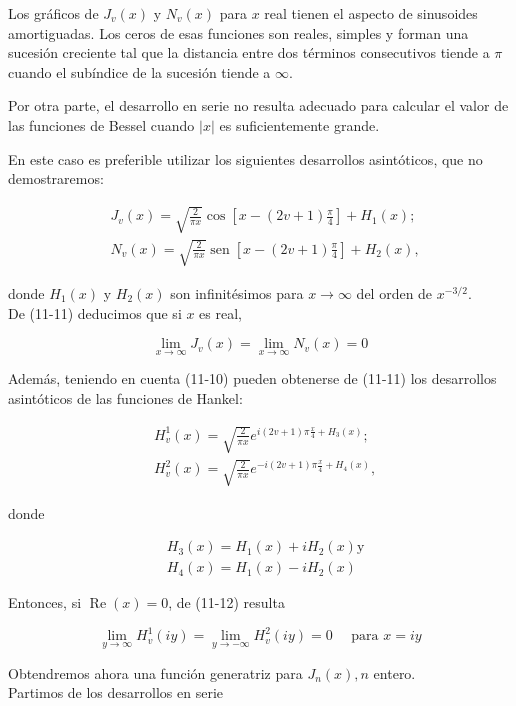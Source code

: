 \documentclass[10pt]{article}
\theoremstyle{plain}
\theoremstyle{definition}
\theoremstyle{remark}
\begin{document}
Los gráficos de $J_{v}(x)$ y $N_{v}(x)$ para $x$ real tienen el aspecto de sinusoides amortiguadas. Los ceros de esas funciones son reales, simples y forman una sucesión creciente tal que la distancia entre dos términos consecutivos tiende a $\pi$ cuando el subíndice de la sucesión tiende a $\infty$.

Por otra parte, el desarrollo en serie no resulta adecuado para calcular el valor de las funciones de Bessel cuando $|x|$ es suficientemente grande.

En este caso es preferible utilizar los siguientes desarrollos asintóticos, que no demostraremos:


\begin{align*}
& J_{v}(x)=\sqrt{\frac{2}{\pi x}} \cos \left[x-(2 v+1) \frac{\pi}{4}\right]+H_{1}(x) ;  \tag{11-11}\\
& N_{v}(x)=\sqrt{\frac{2}{\pi x}} \operatorname{sen}\left[x-(2 v+1) \frac{\pi}{4}\right]+H_{2}(x),
\end{align*}


donde $H_{1}(x)$ y $H_{2}(x)$ son infinitésimos para $x \rightarrow \infty$ del orden de $x^{-3 / 2}$.\\
De (11-11) deducimos que si $x$ es real,

$$
\lim _{x \rightarrow \infty} J_{v}(x)=\lim _{x \rightarrow \infty} N_{v}(x)=0
$$


Además, teniendo en cuenta (11-10) pueden obtenerse de (11-11) los desarrollos asintóticos de las funciones de Hankel:


\begin{align*}
& H_{v}^{1}(x)=\sqrt{\frac{2}{\pi x}} e^{i(2 v+1) \pi \frac{x}{4}+H_{3}(x)} ; \\
& H_{v}^{2}(x)=\sqrt{\frac{2}{\pi x}} e^{-i(2 v+1) \pi \frac{x}{4}+H_{4}(x)}, \tag{11-12}
\end{align*}


donde

$$
\begin{aligned}
& H_{3}(x)=H_{1}(x)+i H_{2}(x) \mathrm{y} \\
& H_{4}(x)=H_{1}(x)-i H_{2}(x)
\end{aligned}
$$

Entonces, si $\operatorname{Re}(x)=0$, de (11-12) resulta

$$
\lim _{y \rightarrow \infty} H_{v}^{1}(i y)=\lim _{y \rightarrow-\infty} H_{v}^{2}(i y)=0 \quad \text { para } x=i y
$$

Obtendremos ahora una función generatriz para $J_{n}(x), n$ entero.\\
Partimos de los desarrollos en serie
\end{document}
